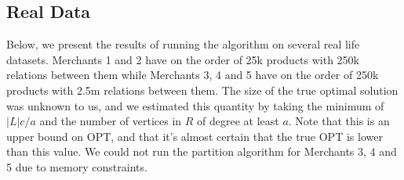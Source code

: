 \subsection{Real Data}
Below, we present the results of running the algorithm on several real life datasets. Merchants 1 and 2 have on the order of 25k products with 250k relations between them while Merchants 3, 4 and 5 have on the order of 250k products with 2.5m relations between them. The size of the true optimal solution was unknown to us, and we estimated this quantity by taking the minimum of $|L|c/a$ and the number of vertices in $R$ of degree at least $a$. Note that this is an upper bound on OPT, and that it's almost certain that the true OPT is lower than this value. We could not run the partition algorithm for Merchants 3, 4 and 5 due to memory constraints.


